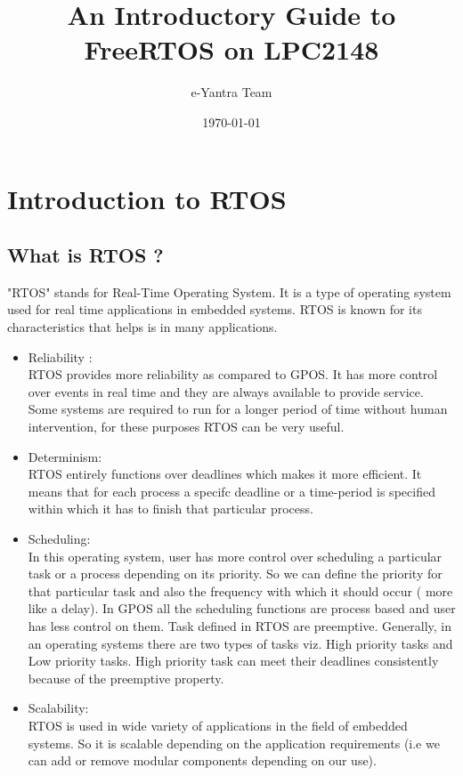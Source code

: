 \documentclass[11pt,a4paper]{book}
\title{An Introductory Guide to FreeRTOS on LPC2148}
\author{e-Yantra Team}
\date{\today}
\begin{document}
	\maketitle
	\newpage
	\tableofcontents
	\newpage
	\section{Introduction to RTOS}
	\subsection{What is RTOS ?}
	"RTOS" stands for Real-Time Operating System.
	It is a type of operating system used for real time applications in embedded systems.
	RTOS is known for its characteristics that helps is in many applications.
	\begin{itemize}
		
		\item Reliability :\\
		RTOS provides more reliability as compared to GPOS.
		It has more control over events in real time and they are always available to provide service.
		Some systems are required to run for a longer period of time without human intervention, for these purposes RTOS can be very useful.
		
		\item Determinism:\\
		RTOS entirely functions over deadlines which makes            it more efficient.
		It means that for each process a specifc deadline or a time-period is specified within which it has to finish that particular process.
		
		\item Scheduling:\\
		In this operating system, user has more control over scheduling a particular task or a process depending on its priority.
		So we can define the priority for that particular  task and also the frequency with which it should occur ( more like a delay).
		In GPOS all the scheduling functions are process based and user has less control on them.
		Task defined in RTOS are preemptive. 
		Generally, in an operating systems there are two types of tasks viz. High priority tasks and Low priority tasks.
		High priority task can meet their deadlines consistently because of the preemptive property.
		
		\item Scalability:\\
		RTOS is used in wide variety of applications in the field of embedded systems.
		So it is scalable depending on the application requirements (i.e we can add or remove modular components depending on our use).
	\end{itemize}
	
\end{document}

